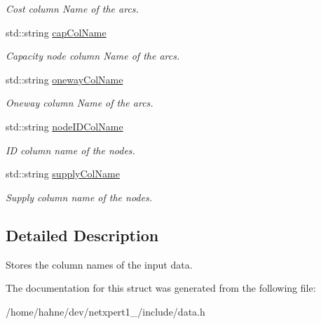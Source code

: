 \begin{DoxyCompactItemize}
\begin{DoxyCompactList}\small\item\em Cost column Name of the arcs. \end{DoxyCompactList}\item 
std\+::string \hyperlink{structnetxpert_1_1data_1_1ColumnMap_af653e17931c6f940746a62db17c1e3a3}{cap\+Col\+Name}\hypertarget{structnetxpert_1_1data_1_1ColumnMap_af653e17931c6f940746a62db17c1e3a3}{}\label{structnetxpert_1_1data_1_1ColumnMap_af653e17931c6f940746a62db17c1e3a3}

\begin{DoxyCompactList}\small\item\em Capacity node column Name of the arcs. \end{DoxyCompactList}\item 
std\+::string \hyperlink{structnetxpert_1_1data_1_1ColumnMap_a46b8b3dbb48282803f1e8b0f53122ecd}{oneway\+Col\+Name}\hypertarget{structnetxpert_1_1data_1_1ColumnMap_a46b8b3dbb48282803f1e8b0f53122ecd}{}\label{structnetxpert_1_1data_1_1ColumnMap_a46b8b3dbb48282803f1e8b0f53122ecd}

\begin{DoxyCompactList}\small\item\em Oneway column Name of the arcs. \end{DoxyCompactList}\item 
std\+::string \hyperlink{structnetxpert_1_1data_1_1ColumnMap_ab1fb1b720e96e33003e3d77179fd870b}{node\+I\+D\+Col\+Name}\hypertarget{structnetxpert_1_1data_1_1ColumnMap_ab1fb1b720e96e33003e3d77179fd870b}{}\label{structnetxpert_1_1data_1_1ColumnMap_ab1fb1b720e96e33003e3d77179fd870b}

\begin{DoxyCompactList}\small\item\em ID column name of the nodes. \end{DoxyCompactList}\item 
std\+::string \hyperlink{structnetxpert_1_1data_1_1ColumnMap_af914fcd7bd73d3f4b678d26d5ac8b586}{supply\+Col\+Name}\hypertarget{structnetxpert_1_1data_1_1ColumnMap_af914fcd7bd73d3f4b678d26d5ac8b586}{}\label{structnetxpert_1_1data_1_1ColumnMap_af914fcd7bd73d3f4b678d26d5ac8b586}

\begin{DoxyCompactList}\small\item\em Supply column name of the nodes. \end{DoxyCompactList}\end{DoxyCompactItemize}


\subsection{Detailed Description}
Stores the column names of the input data. 

The documentation for this struct was generated from the following file\+:\begin{DoxyCompactItemize}
\item 
/home/hahne/dev/netxpert1\+\_/include/data.\+h\end{DoxyCompactItemize}
